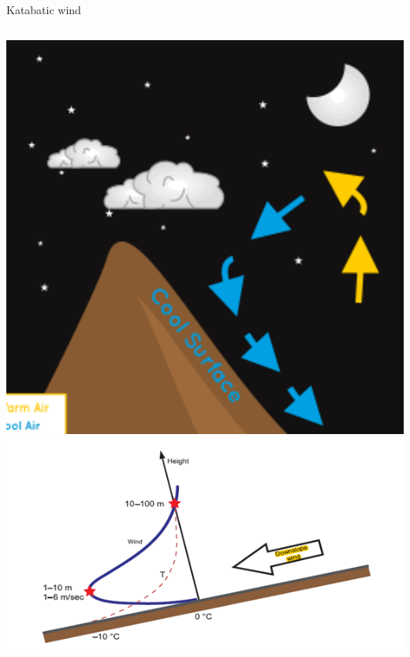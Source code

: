 \documentclass{beamer}
\begin{document}

\begin{frame}{Katabatic wind}

\begin{columns}
\includegraphics[width=1\textwidth]{fig/kata.png}
\includegraphics[width=1\textwidth]{fig/katabatic.png}
\end{columns}

\hfill {\tiny \cite{poulos2008observational}}
\end{frame}

\end{document}
